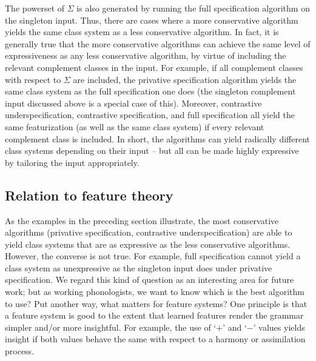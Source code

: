 \documentclass[11pt, oneside]{article}   	%
\begin{document}
The powerset of $\Sigma$ is also generated by running the full specification algorithm on the singleton input. Thus, there are cases where a more conservative algorithm yields the same class system as a less conservative algorithm. In fact, it is generally true that the more conservative algorithms can achieve the same level of expressiveness as any less conservative algorithm, by virtue of including the relevant complement classes in the input. For example, if all complement classes with respect to $\Sigma$ are included, the privative specification algorithm yields the same class system as the full specification one does (the singleton complement input discussed above is a special case of this). Moreover, contrastive underspecification, contrastive specification, and full specification all yield the same featurization (as well as the same class system) if every relevant complement class is included. In short, the algorithms can yield radically different class systems depending on their input -- but all can be made highly expressive by tailoring the input appropriately.

\subsection{Relation to feature theory}

As the examples in the preceding section illustrate, the most conservative algorithms (privative specification, contrastive underspecification) are able to yield class systems that are as expressive as the less conservative algorithms. However, the converse is not true. For example, full specification cannot yield a class system as unexpressive as the singleton input does under privative specification. We regard this kind of question as an interesting area for future work; but as working phonologists, we want to know which is the best algorithm to use? Put another way, what matters for feature systems? One principle is that a feature system is good to the extent that learned features render the grammar simpler and/or more insightful. For example, the use of `$+$' and `$-$' values yields insight if both values behave the same with respect to a harmony or assimilation process.
\end{document}
